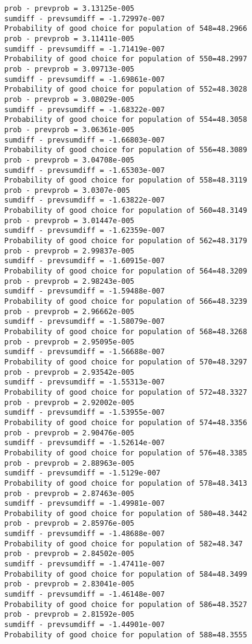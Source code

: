 \documentclass[11pt,onecolumn]{article}
\begin{document}
\begin{verbatim}
prob - prevprob = 3.13125e-005
sumdiff - prevsumdiff = -1.72997e-007
Probability of good choice for population of 548=48.2966
prob - prevprob = 3.11411e-005
sumdiff - prevsumdiff = -1.71419e-007
Probability of good choice for population of 550=48.2997
prob - prevprob = 3.09713e-005
sumdiff - prevsumdiff = -1.69861e-007
Probability of good choice for population of 552=48.3028
prob - prevprob = 3.08029e-005
sumdiff - prevsumdiff = -1.68322e-007
Probability of good choice for population of 554=48.3058
prob - prevprob = 3.06361e-005
sumdiff - prevsumdiff = -1.66803e-007
Probability of good choice for population of 556=48.3089
prob - prevprob = 3.04708e-005
sumdiff - prevsumdiff = -1.65303e-007
Probability of good choice for population of 558=48.3119
prob - prevprob = 3.0307e-005
sumdiff - prevsumdiff = -1.63822e-007
Probability of good choice for population of 560=48.3149
prob - prevprob = 3.01447e-005
sumdiff - prevsumdiff = -1.62359e-007
Probability of good choice for population of 562=48.3179
prob - prevprob = 2.99837e-005
sumdiff - prevsumdiff = -1.60915e-007
Probability of good choice for population of 564=48.3209
prob - prevprob = 2.98243e-005
sumdiff - prevsumdiff = -1.59488e-007
Probability of good choice for population of 566=48.3239
prob - prevprob = 2.96662e-005
sumdiff - prevsumdiff = -1.58079e-007
Probability of good choice for population of 568=48.3268
prob - prevprob = 2.95095e-005
sumdiff - prevsumdiff = -1.56688e-007
Probability of good choice for population of 570=48.3297
prob - prevprob = 2.93542e-005
sumdiff - prevsumdiff = -1.55313e-007
Probability of good choice for population of 572=48.3327
prob - prevprob = 2.92002e-005
sumdiff - prevsumdiff = -1.53955e-007
Probability of good choice for population of 574=48.3356
prob - prevprob = 2.90476e-005
sumdiff - prevsumdiff = -1.52614e-007
Probability of good choice for population of 576=48.3385
prob - prevprob = 2.88963e-005
sumdiff - prevsumdiff = -1.5129e-007
Probability of good choice for population of 578=48.3413
prob - prevprob = 2.87463e-005
sumdiff - prevsumdiff = -1.49981e-007
Probability of good choice for population of 580=48.3442
prob - prevprob = 2.85976e-005
sumdiff - prevsumdiff = -1.48688e-007
Probability of good choice for population of 582=48.347
prob - prevprob = 2.84502e-005
sumdiff - prevsumdiff = -1.47411e-007
Probability of good choice for population of 584=48.3499
prob - prevprob = 2.83041e-005
sumdiff - prevsumdiff = -1.46148e-007
Probability of good choice for population of 586=48.3527
prob - prevprob = 2.81592e-005
sumdiff - prevsumdiff = -1.44901e-007
Probability of good choice for population of 588=48.3555

\end{verbatim}
\end{document}
